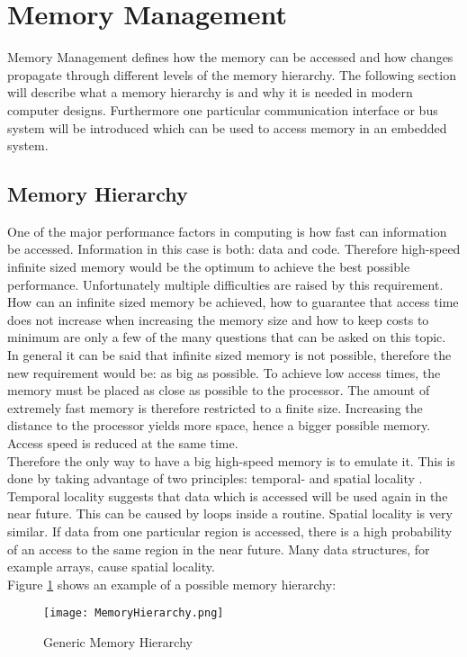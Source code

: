 \section{Memory Management}
Memory Management defines how the memory can be accessed and how changes propagate through different levels of the memory hierarchy. The following section will describe what a memory hierarchy is and why it is needed in modern computer designs. Furthermore one particular communication interface or bus system will be introduced which can be used to access memory in an embedded system. 
\subsection{Memory Hierarchy}
One of the major performance factors in computing is how fast can information be accessed. Information in this case is both: data and code. Therefore high-speed infinite sized memory would be the optimum to achieve the best possible performance. Unfortunately multiple difficulties are raised by this requirement. How can an infinite sized memory be achieved, how to guarantee that access time does not increase when increasing the memory size and how to keep costs to minimum are only a few of the many questions that can be asked on this topic.\\
In general it can be said that infinite sized memory is not possible, therefore the new requirement would be: as big as possible. To achieve low access times, the memory must be placed as close as possible to the processor. The amount of extremely fast memory is therefore restricted to a finite size. Increasing the distance to the processor yields more space, hence a bigger possible memory. Access speed is reduced at the same time.\\
Therefore the only way to have a big high-speed memory is to emulate it. This is done by taking advantage of two principles: temporal- and spatial locality \cite{patterson:2017}. 
Temporal locality suggests that data which is accessed will be used again in the near future. This can be caused by loops inside a routine. 
Spatial locality is very similar. If data from one particular region is accessed, there is a high probability of an access to the same region in the near future. Many data structures, for example arrays, cause spatial locality.\\
Figure \ref{fig:memHierarchy} shows an example of a possible memory hierarchy: 

\begin{figure}[h]
	\centering
	\texttt{[image: MemoryHierarchy.png]}
	\caption{Generic Memory Hierarchy \cite{picture:memoryhierarchy}}
	\label{fig:memHierarchy}
\end{figure}
 
